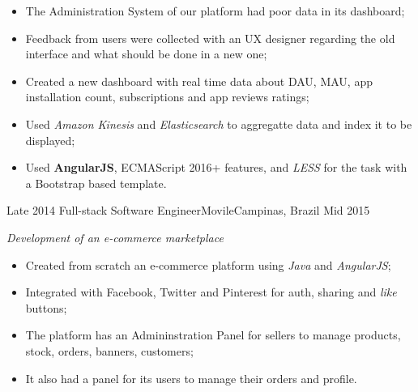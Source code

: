 \begin{experiences}
{          \begin{itemize}
            \item The Administration System of our platform had poor data in its dashboard;
            \item Feedback from users were collected with an UX designer regarding the old interface and what should be done in a new one;
            \item Created a new dashboard with real time data about DAU, MAU, app installation count, subscriptions and app reviews ratings;
            \item Used \emph{Amazon Kinesis} and \emph{Elasticsearch} to aggregatte data and index it to be displayed;
            \item Used \textbf{AngularJS}, ECMAScript 2016+ features, and \emph{LESS} for the task with a Bootstrap based template.\\
          \end{itemize}
        }{}
  \experience
  {Late 2014} {Full-stack Software Engineer}{Movile}{Campinas, Brazil}
  {Mid 2015}
        {
        \emph{Development of an e-commerce marketplace}\\
          \begin{itemize}
            \item Created from scratch an e-commerce platform using \emph{Java} and \emph{AngularJS};
            \item Integrated with Facebook, Twitter and Pinterest for auth, sharing and \emph{like} buttons;
            \item The platform has an Admininstration Panel for sellers to manage products, stock, orders, banners, customers; 
            \item It also had a panel for its users to manage their orders and profile.\\ 
          \end{itemize}
        }{}
\end{experiences}